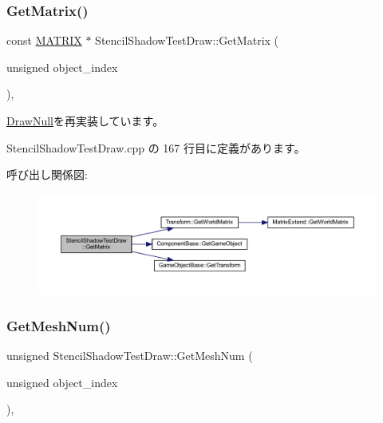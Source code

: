 \subsubsection{\texorpdfstring{Get\+Matrix()}{GetMatrix()}}
{\footnotesize\ttfamily const \mbox{\hyperlink{_vector3_d_8h_a032295cd9fb1b711757c90667278e744}{M\+A\+T\+R\+IX}} $\ast$ Stencil\+Shadow\+Test\+Draw\+::\+Get\+Matrix (\begin{DoxyParamCaption}\item[{unsigned}]{object\+\_\+index }\end{DoxyParamCaption})\hspace{0.3cm}{\ttfamily [override]}, {\ttfamily [virtual]}}



\mbox{\hyperlink{class_draw_null_adede079e9c11a756090740b20bb43022}{Draw\+Null}}を再実装しています。



 Stencil\+Shadow\+Test\+Draw.\+cpp の 167 行目に定義があります。

呼び出し関係図\+:\nopagebreak
\begin{figure}[H]
\begin{center}
\leavevmode
\includegraphics[width=350pt]{class_stencil_shadow_test_draw_adfa99798c61ac13f209dc99f1e2694c5_cgraph}
\end{center}
\end{figure}
\mbox{\label{class_stencil_shadow_test_draw_acfa569f1dcdc3829796138e313f204ad}} 
\subsubsection{\texorpdfstring{Get\+Mesh\+Num()}{GetMeshNum()}}
{\footnotesize\ttfamily unsigned Stencil\+Shadow\+Test\+Draw\+::\+Get\+Mesh\+Num (\begin{DoxyParamCaption}\item[{unsigned}]{object\+\_\+index }\end{DoxyParamCaption})\hspace{0.3cm}{\ttfamily [override]}, {\ttfamily [virtual]}}



